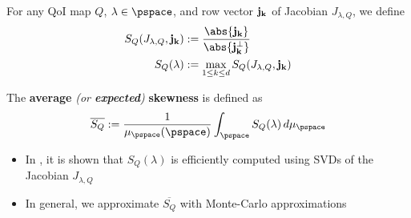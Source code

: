 \begin{frame}[t]
\begin{defn}
For any QoI map $Q$, $\lambda \in \pspace$, and row vector $\bf{j}_k$ of Jacobian $J_{\lambda, Q}$, we define
\begin{equation}
\begin{split}
S_Q(J_{\lambda,Q}, \bf{j}_k) &:= \frac{\abs{\bf{j}_k} }{\abs{\bf{j}_k^\perp}} \\
S_Q(\lambda) &:= \max_{1\leq k \leq d} S_Q(J_{\lambda,Q}, \bf{j}_k)
\end{split}
\end{equation}
\end{defn}

\begin{defn}
The \textbf{average} \emph{(or \textbf{expected})} \textbf{skewness} is defined as
\begin{equation}
\overline{S_Q} := \frac{1}{\mu_{\pspace}(\pspace)} \int_\pspace S_Q (\lambda) \, d\mu_{\pspace}
\label{eq:avgskew}
\end{equation}
\end{defn}

\begin{itemize}
	\item In \cite{BPW17}, it is shown that $S_Q(\lambda)$ is efficiently computed using SVDs of the Jacobian $J_{\lambda,Q}$
	\item In general, we approximate $\overline{S_Q}$ with Monte-Carlo approximations
\end{itemize}

\end{frame}






